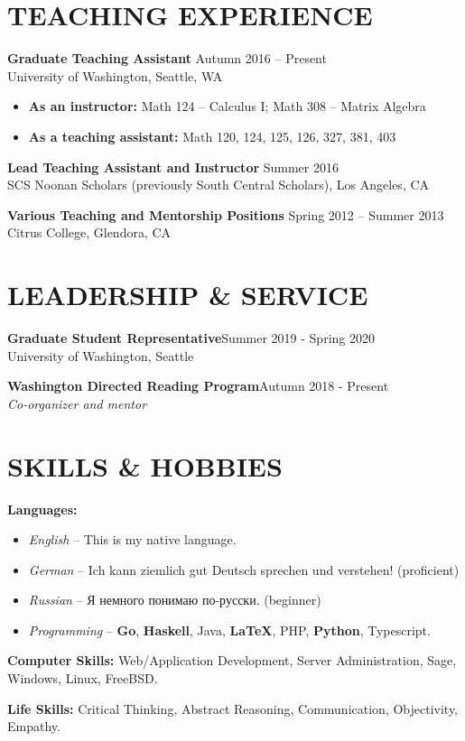 \documentclass[margin]{res} %
\begin{document}
\begin{resume}
\section{TEACHING EXPERIENCE}

{\bf Graduate Teaching Assistant} \hfill Autumn 2016 -- Present \\
University of Washington, Seattle, WA

\begin{itemize} \itemsep -1pt %
\item\textbf{As an instructor:} Math 124 -- Calculus I; Math 308 -- Matrix Algebra
\item \textbf{As a teaching assistant:} Math 120, 124, 125, 126, 327, 381, 403
\end{itemize}
 
{\bf Lead Teaching Assistant and Instructor} \hfill Summer 2016 \\
SCS Noonan Scholars (previously South Central Scholars), Los Angeles, CA

{\bf Various Teaching and Mentorship Positions} \hfill Spring 2012 -- Summer 2013 \\
Citrus College, Glendora, CA

\section{LEADERSHIP \& SERVICE}

{\bf Graduate Student Representative}\hfill Summer 2019 - Spring 2020\\
University of Washington, Seattle


{\bf Washington Directed Reading Program}\hfill Autumn 2018 - Present\\
{\sl Co-organizer and mentor}


\section{SKILLS \& HOBBIES} 

{\bf Languages:}
\begin{itemize} \itemsep -2pt
	\item {\sl English} -- This is my native language.
	\item {\sl German} -- Ich kann ziemlich gut Deutsch sprechen und verstehen! (proficient)
	\item {\sl Russian} -- \foreignlanguage{russian}{Я немного понимаю по-русски.} (beginner)
	\item {\sl Programming} -- {\bf Go}, {\bf Haskell}, Java, {\bf \LaTeX}, PHP, {\bf Python}, Typescript.
\end{itemize}
{\bf Computer Skills:} Web/Application Development, Server Administration, Sage, Windows, Linux, FreeBSD.

{\bf Life Skills:} Critical Thinking, Abstract Reasoning, Communication, Objectivity, Empathy.

\end{resume}
\end{document}
